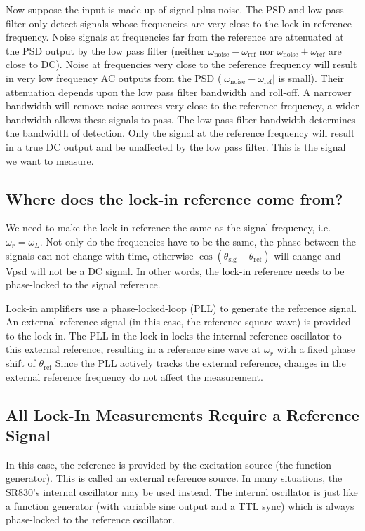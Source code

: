 \documentclass{../lab}
\begin{document}
Now suppose the input is made up of signal plus noise. The PSD and low pass filter only detect signals whose frequencies are very close to the lock-in reference frequency. Noise signals at frequencies far from the reference are attenuated at the PSD output by the low pass filter (neither $\omega_\text{noise} - \omega_\text{ref}$ nor $\omega_\text{noise} + \omega_\text{ref}$ are close to DC). Noise at frequencies very close to the reference frequency will result in very low frequency AC outputs from the PSD ($|\omega_\text{noise} - \omega_\text{ref}|$ is small). Their attenuation depends upon the low pass filter bandwidth and roll-off. A narrower bandwidth will remove noise sources very close to the reference frequency, a wider bandwidth allows these signals to pass. The low pass filter bandwidth determines the bandwidth of detection. Only the signal at the reference frequency will result in a true DC output and be unaffected by the low pass filter. This is the signal we want to measure.

\subsection{Where does the lock-in reference come from?}

We need to make the lock-in reference the same as the signal frequency, i.e. $\omega_r = \omega_L$. Not only do the frequencies have to be the same, the phase between the signals can not change with time, otherwise $\cos(\theta_\text{sig} - \theta_\text{ref})$ will change and Vpsd will not be a DC signal. In other words, the lock-in reference needs to be phase-locked to the signal reference.

Lock-in amplifiers use a phase-locked-loop (PLL) to generate the reference signal. An external reference signal (in this case, the reference square wave) is provided to the lock-in. The PLL in the lock-in locks the internal reference oscillator to this external reference, resulting in a reference sine wave at $\omega_r $ with a fixed phase shift of $\theta_\text{ref}$ Since the PLL actively tracks the external reference, changes in the external reference frequency do not affect the measurement.

\subsection{All Lock-In Measurements Require a Reference Signal}

In this case, the reference is provided by the excitation source (the function generator). This is called an external reference source. In many situations, the SR830's internal oscillator may be used instead. The internal oscillator is just like a function generator (with variable sine output and a TTL sync) which is always phase-locked to the reference oscillator.
\end{document}
